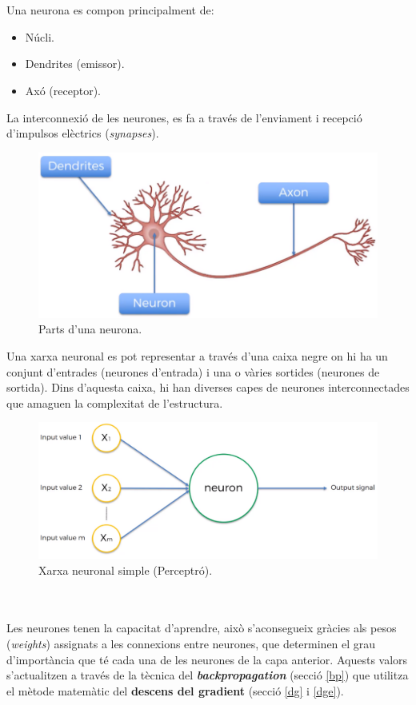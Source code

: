 \documentclass[12pt]{article}
\begin{document}
\\\\Una neurona es compon principalment de:
\begin{itemize}
	\item Núcli.
	\item Dendrites (emissor).
	\item Axó (receptor).
\end{itemize}
La interconnexió de les neurones, es fa a través de l'enviament i recepció d'impulsos elèctrics (\textit{synapses}).
\pagebreak
\clearpage
\begin{figure}[h!]
	\centering
	\includegraphics[scale=0.4]{imatges/neurona/9parts.png}
	\caption{Parts d'una neurona.}
\end{figure}
Una xarxa neuronal es pot representar a través d'una caixa negre on hi ha un conjunt d'entrades (neurones d'entrada) i una o vàries sortides (neurones de sortida). Dins d'aquesta caixa, hi han diverses capes de neurones interconnectades que amaguen la complexitat de l'estructura.
\begin{figure}[h!]
	\centering
	\includegraphics[scale=0.2]{imatges/neurona/5estructura.png}
	\caption{Xarxa neuronal simple (Perceptró).}
\end{figure}
\\\\Les neurones tenen la capacitat d'aprendre, això s'aconsegueix gràcies als pesos (\textit{weights}) assignats a les connexions entre neurones, que determinen el grau d'importància que té cada una de les neurones de la capa anterior. Aquests valors s'actualitzen a través de la tècnica del \textbf{\textit{backpropagation}} (secció \ref{bp}) que utilitza el mètode matemàtic del \textbf{descens del gradient} (secció \ref{dg} i \ref{dge}). 
\end{document}
